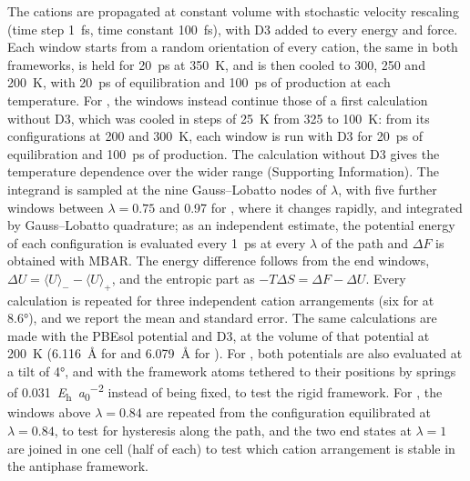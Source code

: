 {The cations are propagated at constant volume with stochastic velocity rescaling (time step \SI{1}{fs}, time constant
\SI{100}{fs}), with D3 added to every energy and force. Each window starts from a random orientation of every cation,
the same in both frameworks, is held for \SI{20}{ps} at \SI{350}{K}, and is then cooled to 300, 250 and \SI{200}{K},
with \SI{20}{ps} of equilibration and \SI{100}{ps} of production at each temperature. For \FASnI{}, the windows
instead continue those of a first calculation without D3, which was cooled in steps of \SI{25}{K} from 325 to
\SI{100}{K}: from its configurations at 200 and \SI{300}{K}, each window is run with D3 for \SI{20}{ps} of
equilibration and \SI{100}{ps} of production. The calculation without D3 gives the temperature dependence over the
wider range (Supporting Information). The integrand is sampled at the nine Gauss--Lobatto nodes of $\lambda$, with five further windows
between $\lambda = 0.75$ and 0.97 for \FASnI{}, where it changes rapidly, and integrated by Gauss--Lobatto quadrature;
as an independent estimate, the potential energy of each configuration is evaluated every \SI{1}{ps} at every
$\lambda$ of the path and $\Delta F$ is obtained with MBAR.\cite{Shirts2008JCP} The energy difference follows from the
end windows, $\Delta U = \langle U\rangle_{-} - \langle U\rangle_{+}$, and the entropic part as
$-T\Delta S = \Delta F - \Delta U$. Every calculation is repeated for three independent cation arrangements (six for
\MASnI{} at \ang{8.6}), and we report the mean and standard error. The same calculations are made with the PBEsol
potential and D3, at the volume of that potential at \SI{200}{K} (\SI{6.116}{\angstrom} for \FASnI{} and
\SI{6.079}{\angstrom} for \MASnI{}). For \MASnI{}, both potentials are also evaluated at a tilt of \ang{4}, and with
the framework atoms tethered to their positions by springs of \SI{0.031}{\hartree\per\bohr\squared} instead of being
fixed, to test the rigid framework. For \FASnI{}, the windows above $\lambda = 0.84$ are repeated from the configuration
equilibrated at $\lambda = 0.84$, to test for hysteresis along the path, and the two end states at $\lambda = 1$ are
joined in one cell (half of each) to test which cation arrangement is stable in the antiphase framework.
}
